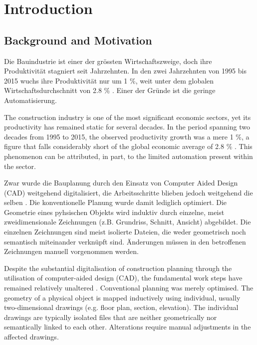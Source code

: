\chapter{Introduction}
\label{sec:introduction}

\section{Background and Motivation}
\label{sec:background_motivation}
\begin{German}
    Die Bauindustrie ist einer der grössten Wirtschaftszweige, doch ihre Produktivität stagniert seit Jahrzehnten. In den zwei Jahrzehnten von 1995 bis 2015 wuchs ihre Produktivität nur um 1 \%, weit unter dem globalen Wirtschaftsdurchschnitt von 2.8 \% \cite{barbosaReinventingConstructionRoute2017}. Einer der Gründe ist die geringe Automatisierung.
\end{German}
\begin{English}
    The construction industry is one of the most significant economic sectors, yet its productivity has remained static for several decades. In the period spanning two decades from 1995 to 2015, the observed productivity growth was a mere 1 \%, a figure that falls considerably short of the global economic average of 2.8 \% \cite{barbosaReinventingConstructionRoute2017}. This phenomenon can be attributed, in part, to the limited automation present within the sector.
\end{English}

\begin{German}
    Zwar wurde die Bauplanung durch den Einsatz von Computer Aided Design (CAD) weitgehend digitalisiert, die Arbeitsschritte blieben jedoch weitgehend die selben \cite{eichlerBIMcertHandbuchGrundlagenwissen2023}. Die konventionelle Planung wurde damit lediglich optimiert. Die Geometrie eines pyhsischen Objekts wird induktiv durch einzelne, meist zweidimensionale Zeichnungen (z.B. Grundriss, Schnitt, Ansicht) abgebildet. Die einzelnen Zeichnungen sind meist isolierte Dateien, die weder geometrisch noch semantisch miteinander verknüpft sind. Änderungen müssen in den betroffenen Zeichnungen manuell vorgenommen werden. \cite{eichlerBIMcertHandbuchGrundlagenwissen2023}
\end{German}

\begin{English}
    Despite the substantial digitalisation of construction planning through the utilisation of computer-aided design (CAD), the fundamental work steps have remained relatively unaltered \cite{eichlerBIMcertHandbuchGrundlagenwissen2023}. Conventional planning was merely optimised. The geometry of a physical object is mapped inductively using individual, usually two-dimensional drawings (e.g. floor plan, section, elevation). The individual drawings are typically isolated files that are neither geometrically nor semantically linked to each other. Alterations require manual adjustments in the affected drawings. \cite{eichlerBIMcertHandbuchGrundlagenwissen2023}
\end{English}

